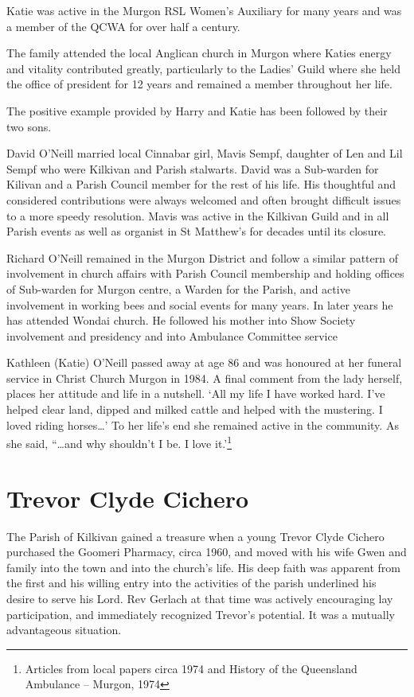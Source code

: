 Katie was active in the Murgon RSL Women's Auxiliary for many years and was a member of the QCWA for over half a century.

The family attended the local Anglican church in Murgon where Katies energy and vitality contributed greatly, particularly to the Ladies' Guild where she held the office of president for 12 years and remained a member throughout her life.

The positive example provided by Harry and Katie has been followed by their two sons.

David O'Neill married local Cinnabar girl, Mavis Sempf, daughter of Len and Lil Sempf who were Kilkivan and Parish stalwarts. David was a Sub-warden for Kilivan and a Parish Council member for the rest of his life. His thoughtful and considered contributions were always welcomed and often brought difficult issues to a more speedy resolution. Mavis was active in the Kilkivan Guild and in all Parish events as well as organist in St Matthew's for decades until its closure.

Richard O'Neill remained in the Murgon District and follow a similar pattern of involvement in church affairs with Parish Council membership and holding offices of Sub-warden for Murgon centre, a Warden for the Parish, and active involvement in working bees and social events for many years. In later years he has attended Wondai church. He followed his mother into Show Society involvement and presidency and into Ambulance Committee service

Kathleen (Katie) O'Neill passed away at age 86 and was honoured at her funeral service in Christ Church Murgon in 1984. A final comment from the lady herself, places her attitude and life in a nutshell. `All my life I have worked hard. I've helped clear land, dipped and milked cattle and helped with the mustering. I loved riding horses\ldots' To her life's end she remained active in the community. As she said, ``\ldots and why shouldn't I be. I love it.'\footnote{Articles from local papers circa 1974 and History of the Queensland Ambulance -- Murgon, 1974}

\hypertarget{trevor-clyde-cichero}{%
\section{Trevor Clyde Cichero}\label{trevor-clyde-cichero}}

The Parish of Kilkivan gained a treasure when a young Trevor Clyde Cichero purchased the Goomeri Pharmacy, circa 1960, and moved with his wife Gwen and family into the town and into the church's life. His deep faith was apparent from the first and his willing entry into the activities of the parish underlined his desire to serve his Lord. Rev Gerlach at that time was actively encouraging lay participation, and immediately recognized Trevor's potential. It was a mutually advantageous situation.

